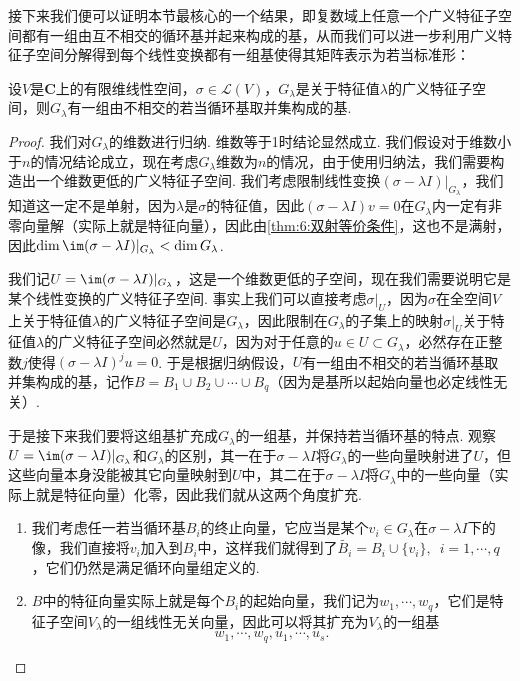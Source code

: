 接下来我们便可以证明本节最核心的一个结果，即复数域上任意一个广义特征子空间都有一组由互不相交的循环基并起来构成的基，从而我们可以进一步利用广义特征子空间分解得到每个线性变换都有一组基使得其矩阵表示为若当标准形：
\begin{theorem} \label{thm:17:广义特征子空间分解若当基}
    设$V$是$\mathbf{C}$上的有限维线性空间，$\sigma\in\mathcal{L}(V)$，$G_\lambda$是关于特征值$\lambda$的广义特征子空间，则$G_\lambda$有一组由不相交的若当循环基取并集构成的基.
\end{theorem}
\begin{proof}
    我们对$G_\lambda$的维数进行归纳. 维数等于1时结论显然成立. 我们假设对于维数小于$n$的情况结论成立，现在考虑$G_\lambda$维数为$n$的情况，由于使用归纳法，我们需要构造出一个维数更低的广义特征子空间. 我们考虑限制线性变换$(\sigma-\lambda I)\vert_{G_\lambda}$，我们知道这一定不是单射，因为$\lambda$是$\sigma$的特征值，因此$(\sigma-\lambda I)v=0$在$G_\lambda$内一定有非零向量解（实际上就是特征向量），因此由\autoref{thm:6:双射等价条件}，这也不是满射，因此$\dim\im(\sigma-\lambda I)\vert_{G_\lambda}<\dim G_\lambda$.

    我们记$U=\im(\sigma-\lambda I)\vert_{G_\lambda}$，这是一个维数更低的子空间，现在我们需要说明它是某个线性变换的广义特征子空间. 事实上我们可以直接考虑$\sigma\vert_U$，因为$\sigma$在全空间$V$上关于特征值$\lambda$的广义特征子空间是$G_\lambda$，因此限制在$G_\lambda$的子集上的映射$\sigma\vert_U$关于特征值$\lambda$的广义特征子空间必然就是$U$，因为对于任意的$u\in U\subset G_\lambda$，必然存在正整数$j$使得$(\sigma-\lambda I)^ju=0$. 于是根据归纳假设，$U$有一组由不相交的若当循环基取并集构成的基，记作$B=B_1\cup B_2\cup\cdots\cup B_q$（因为是基所以起始向量也必定线性无关）.

    于是接下来我们要将这组基扩充成$G_\lambda$的一组基，并保持若当循环基的特点. 观察$U=\im(\sigma-\lambda I)\vert_{G_\lambda}$和$G_\lambda$的区别，其一在于$\sigma-\lambda I$将$G_\lambda$的一些向量映射进了$U$，但这些向量本身没能被其它向量映射到$U$中，其二在于$\sigma-\lambda I$将$G_\lambda$中的一些向量（实际上就是特征向量）化零，因此我们就从这两个角度扩充.
    \begin{enumerate}
        \item 我们考虑任一若当循环基$B_i$的终止向量，它应当是某个$v_i\in G_\lambda$在$\sigma-\lambda I$下的像，我们直接将$v_i$加入到$B_i$中，这样我们就得到了$\tilde{B_i}=B_i\cup\{v_i\},\enspace i=1,\cdots,q$，它们仍然是满足循环向量组定义的.
        \item $B$中的特征向量实际上就是每个$B_i$的起始向量，我们记为$w_1,\cdots,w_q$，它们是特征子空间$V_\lambda$的一组线性无关向量，因此可以将其扩充为$V_\lambda$的一组基
        \[w_1,\cdots,w_q,u_1,\cdots,u_s.\]
    \end{enumerate}


\end{proof}
